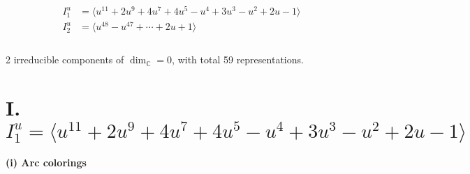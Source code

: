 \documentclass[1p]{elsarticle_modified}
\theoremstyle{definition}
\begin{document}
\begin{align*}
I^u_{1}&=\langle 
u^{11}+2 u^9+4 u^7+4 u^5- u^4+3 u^3- u^2+2 u-1\rangle \\
I^u_{2}&=\langle 
u^{48}- u^{47}+\cdots+2 u+1\rangle \\
\\
\end{align*}
\raggedright * 2 irreducible components of $\dim_{\mathbb{C}}=0$, with total 59 representations.\\
\newpage
\renewcommand{\arraystretch}{1}
\centering \section*{I. $I^u_{1}= \langle u^{11}+2 u^9+4 u^7+4 u^5- u^4+3 u^3- u^2+2 u-1 \rangle$}
\flushleft \textbf{(i) Arc colorings}\\
\end{document}
